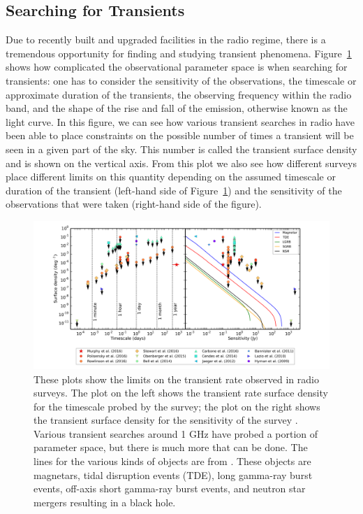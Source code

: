 \documentclass[12pt]{article}
\begin{document}
\subsection{Searching for Transients}

Due to recently built and upgraded facilities in the radio regime, there is a tremendous opportunity for finding and studying transient phenomena. Figure~\ref{murphy2017} \citep{2017MNRAS.466.1944M} shows how complicated the observational parameter space is when searching for transients: one has to consider the sensitivity of the observations, the timescale or approximate duration of the transients, the observing frequency within the radio band, and the shape of the rise and fall of the emission, otherwise known as the light curve. In this figure, we can see how various transient searches in radio have been able to place constraints on the possible number of times a transient will be seen in a given part of the sky. This number is called the transient surface density and is shown on the vertical axis. From this plot we also see how different surveys place different limits on this quantity depending on the assumed timescale or duration of the transient (left-hand side of Figure~\ref{murphy2017}) and the sensitivity of the observations that were taken (right-hand side of the figure). 

	\begin{figure}
		\includegraphics[width=\textwidth]{rates.png}
		\caption{These plots show the limits on the transient rate observed in radio surveys. The plot on the left shows the transient rate surface density for the timescale probed by the survey; the plot on the right shows the transient surface density for the sensitivity of the survey \citep{2017MNRAS.466.1944M}. Various transient searches around 1 GHz have probed a portion of parameter space, but there is much more that can be done. The lines for the various kinds of objects are from \citet{2015ApJ...806..224M}. These objects are magnetars, tidal disruption events (TDE), long gamma-ray burst events, off-axis short gamma-ray burst events, and neutron star mergers resulting in a black hole.}
		\label{murphy2017}
	\end{figure}
\end{document}

